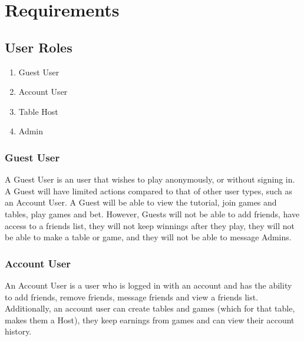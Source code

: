 \section{Requirements}




\subsection{User Roles}
\begin{enumerate}[nosep]
    \item Guest User
    \item Account User
    \item Table Host
    \item Admin
\end{enumerate} 


\subsubsection{Guest User}
A Guest User is an user that wishes to play anonymously, or without signing in. A Guest will have limited actions compared to that of other user types, such as an Account User. A Guest will be able to view the tutorial, join games and tables, play games and bet. However, Guests will not be able to add friends, have access to a friends list, they will not keep winnings after they play, they will not be able to make a table or game, and they will not be able to message Admins.

\subsubsection{Account User}
An Account User is a user who is logged in with an account and has the ability to add friends, remove friends, message friends and view a friends list. Additionally, an account user can create tables and games (which for that table, makes them a Host), they keep earnings from games and can view their account history. 

